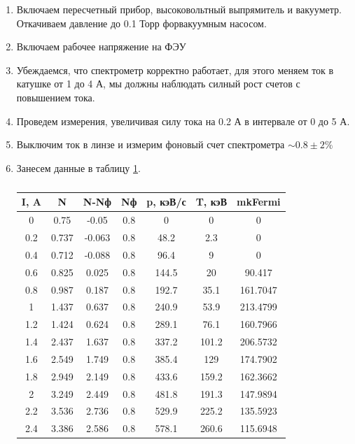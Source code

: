 \documentclass[a4paper]{article}
\begin{document}
\begin{enumerate}
    \item Включаем пересчетный прибор, высоковольтный выпрямитель и вакууметр. Откачиваем давление
    до 0.1 Торр форвакуумным насосом.
    \item Включаем рабочее напряжение на ФЭУ
    \item Убеждаемся, что спектрометр корректно работает, для этого меняем ток в катушке от 1 до 
    4 А, мы должны наблюдать силный рост счетов с повышением тока.
    \item Проведем измерения, увеличивая силу тока на 0.2 А в интервале от 0 до 5 А.
    \item Выключим ток в линзе и измерим фоновый счет спектрометра $\sim 0.8 \pm 2\%$
    \item Занесем данные в таблицу \ref{t1}.
    \begin{table}[H]
        \centering
        \caption{}
        \label{t1}
        \begin{tabular}{|c|c|c|c|c|c|c|}
            \hline
            I, A & N & N-Nф & Nф & p, кэВ/с & T, кэВ & mkFermi \\
            \hline \hline
            0 & 0.75 & -0.05 & 0.8 & 0 & 0 & 0 \\ \hline
            0.2 & 0.737 & -0.063 & 0.8 & 48.2 & 2.3 & 0 \\ \hline
            0.4 & 0.712 & -0.088 & 0.8 & 96.4 & 9 & 0 \\ \hline
            0.6 & 0.825 & 0.025 & 0.8 & 144.5 & 20 & 90.417 \\ \hline
            0.8 & 0.987 & 0.187 & 0.8 & 192.7 & 35.1 & 161.7047 \\ \hline
            1 & 1.437 & 0.637 & 0.8 & 240.9 & 53.9 & 213.4799 \\ \hline
            1.2 & 1.424 & 0.624 & 0.8 & 289.1 & 76.1 & 160.7966 \\ \hline
            1.4 & 2.437 & 1.637 & 0.8 & 337.2 & 101.2 & 206.5732 \\ \hline
            1.6 & 2.549 & 1.749 & 0.8 & 385.4 & 129 & 174.7902 \\ \hline
            1.8 & 2.949 & 2.149 & 0.8 & 433.6 & 159.2 & 162.3662 \\ \hline
            2 & 3.249 & 2.449 & 0.8 & 481.8 & 191.3 & 147.9894 \\ \hline
            2.2 & 3.536 & 2.736 & 0.8 & 529.9 & 225.2 & 135.5923 \\ \hline
            2.4 & 3.386 & 2.586 & 0.8 & 578.1 & 260.6 & 115.6948 \\ \hline

\end{tabular}
\end{table}
\end{enumerate}
\end{document}

